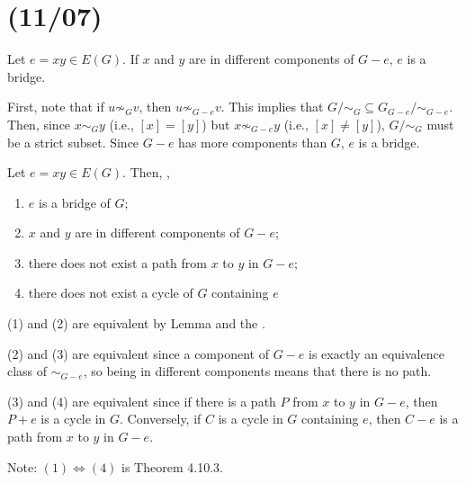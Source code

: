 \documentclass[class=math239,notes,tikz]{agony}
\begin{document}
\section{(11/07)}

\begin{prop}\label{prop:compbridge}
  Let $e = xy \in E(G)$.
  If $x$ and $y$ are in different components of $G-e$, $e$ is a bridge.
\end{prop}
\begin{prf}
  First, note that if $u \not\sim_G v$, then $u \not\sim_{G-e} v$.
  This implies that $G/{\sim_G} \subseteq G_{G-e}/{\sim_{G-e}}$.
  Then, since $x \sim_G y$ (i.e., $[x] = [y]$)
  but $x \not\sim_{G-e} y$ (i.e., $[x] \neq [y]$),
  $G/{\sim_G}$ must be a strict subset.
  Since $G-e$ has more components than $G$, $e$ is a bridge.
\end{prf}

\begin{theorem}[4.10.3]\label{thm:bridge}
  Let $e = xy \in E(G)$. Then, \Tfae,
  \begin{enumerate}[(1),nosep]
    \item $e$ is a bridge of $G$;
    \item $x$ and $y$ are in different components of $G-e$;
    \item there does not exist a path from $x$ to $y$ in $G-e$;
    \item there does not exist a cycle of $G$ containing $e$
  \end{enumerate}
\end{theorem}
\begin{prf}
  (1) and (2) are equivalent by Lemma 
  and the .

  (2) and (3) are equivalent since a component of $G-e$
  is exactly an equivalence class of $\sim_{G-e}$,
  so being in different components means that there is no path.

  (3) and (4) are equivalent since if there is a path $P$ from $x$ to $y$ in $G-e$,
  then $P + e$ is a cycle in $G$.
  Conversely, if $C$ is a cycle in $G$ containing $e$, then $C-e$
  is a path from $x$ to $y$ in $G-e$.

  Note: $(1) \iff (4)$ is Theorem 4.10.3.
\end{prf}
\end{document}
